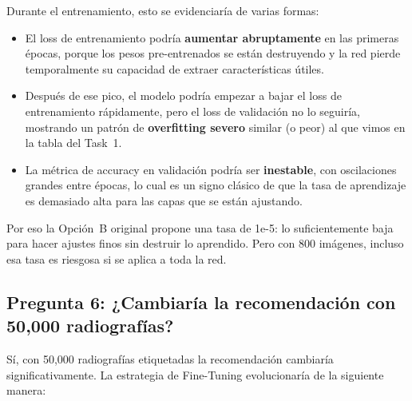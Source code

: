 \documentclass[12pt, letterpaper]{article}
\begin{document}
Durante el entrenamiento, esto se evidenciaría de varias formas:

\begin{itemize}[leftmargin=1.5cm]
    \item El loss de entrenamiento podría \textbf{aumentar abruptamente} en las primeras épocas,
    porque los pesos pre-entrenados se están destruyendo y la red pierde temporalmente su
    capacidad de extraer características útiles.

    \item Después de ese pico, el modelo podría empezar a bajar el loss de entrenamiento
    rápidamente, pero el loss de validación no lo seguiría, mostrando un patrón de
    \textbf{overfitting severo} similar (o peor) al que vimos en la tabla del Task~1.

    \item La métrica de accuracy en validación podría ser \textbf{inestable}, con oscilaciones
    grandes entre épocas, lo cual es un signo clásico de que la tasa de aprendizaje es
    demasiado alta para las capas que se están ajustando.
\end{itemize}

Por eso la Opción~B original propone una tasa de 1e-5: lo suficientemente baja para hacer
ajustes finos sin destruir lo aprendido. Pero con 800 imágenes, incluso esa tasa es riesgosa
si se aplica a toda la red.

\subsection{Pregunta 6: ¿Cambiaría la recomendación con 50,000 radiografías?}

Sí, con 50,000 radiografías etiquetadas la recomendación cambiaría significativamente. La
estrategia de Fine-Tuning evolucionaría de la siguiente manera:
\end{document}
